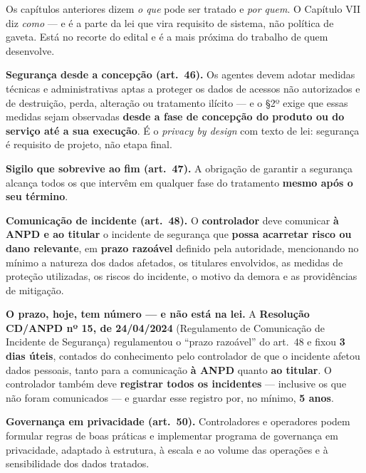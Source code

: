 Os capítulos anteriores dizem \emph{o que} pode ser tratado e \emph{por quem}.
O Capítulo VII diz \emph{como} --- e é a parte da lei que vira requisito de
sistema, não política de gaveta. Está no recorte do edital e é a mais próxima
do trabalho de quem desenvolve.

\begin{conceito}
\textbf{Segurança desde a concepção (art.\ 46).} Os agentes devem adotar
medidas técnicas e administrativas aptas a proteger os dados de acessos não
autorizados e de destruição, perda, alteração ou tratamento ilícito --- e o
§2º exige que essas medidas sejam observadas \textbf{desde a fase de concepção
do produto ou do serviço até a sua execução}. É o \emph{privacy by design}
com texto de lei: segurança é requisito de projeto, não etapa final.

\textbf{Sigilo que sobrevive ao fim (art.\ 47).} A obrigação de garantir a
segurança alcança todos os que intervêm em qualquer fase do tratamento
\textbf{mesmo após o seu término}.

\textbf{Comunicação de incidente (art.\ 48).} O \textbf{controlador} deve
comunicar \textbf{à ANPD e ao titular} o incidente de segurança que
\textbf{possa acarretar risco ou dano relevante}, em \textbf{prazo razoável}
definido pela autoridade, mencionando no mínimo a natureza dos dados afetados,
os titulares envolvidos, as medidas de proteção utilizadas, os riscos do
incidente, o motivo da demora e as providências de mitigação.

\textbf{O prazo, hoje, tem número --- e não está na lei.} A
\textbf{Resolução CD/ANPD nº 15, de 24/04/2024} (Regulamento de Comunicação de
Incidente de Segurança) regulamentou o ``prazo razoável'' do art.\ 48 e fixou
\textbf{3 dias úteis}, contados do conhecimento pelo controlador de que o
incidente afetou dados pessoais, tanto para a comunicação \textbf{à ANPD}
quanto \textbf{ao titular}. O controlador também deve \textbf{registrar todos
os incidentes} --- inclusive os que não foram comunicados --- e guardar esse
registro por, no mínimo, \textbf{5 anos}.

\textbf{Governança em privacidade (art.\ 50).} Controladores e operadores
podem formular regras de boas práticas e implementar programa de governança em
privacidade, adaptado à estrutura, à escala e ao volume das operações e à
sensibilidade dos dados tratados.
\end{conceito}

